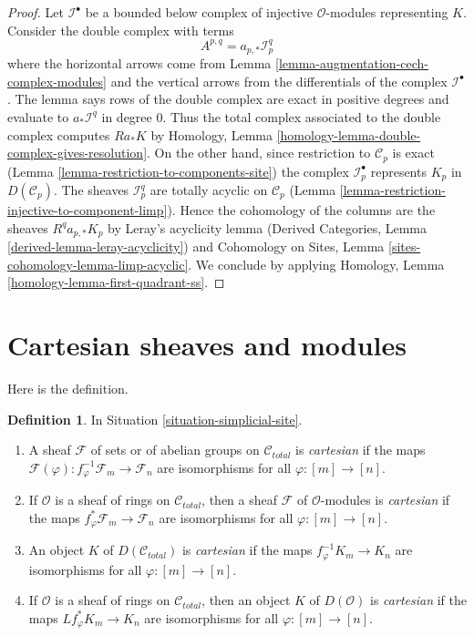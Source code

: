 \documentclass{stacks-project}
\theoremstyle{plain}
\theoremstyle{definition}
\newtheorem{definition}[subsection]{Definition}
\theoremstyle{remark}
\numberwithin{equation}{subsection}
\begin{document}
\begin{proof}
Let $\mathcal{I}^\bullet$ be a bounded below complex of injective
$\mathcal{O}$-modules representing $K$. Consider the double complex with terms
$$
A^{p, q} = a_{p, *}\mathcal{I}^q_p
$$
where the horizontal arrows come from
Lemma \ref{lemma-augmentation-cech-complex-modules}
and the vertical arrows from the differentials of the
complex $\mathcal{I}^\bullet$. The lemma
says rows of the double complex are exact
in positive degrees and evaluate to
$a_*\mathcal{I}^q$ in degree $0$.
Thus the total complex associated to the double complex
computes $Ra_*K$ by
Homology, Lemma \ref{homology-lemma-double-complex-gives-resolution}.
On the other hand, since restriction to $\mathcal{C}_p$ is exact
(Lemma \ref{lemma-restriction-to-components-site})
the complex $\mathcal{I}_p^\bullet$ represents $K_p$ in
$D(\mathcal{C}_p)$. The sheaves $\mathcal{I}_p^q$
are totally acyclic on $\mathcal{C}_p$
(Lemma \ref{lemma-restriction-injective-to-component-limp}).
Hence the cohomology of the columns are the sheaves
$R^qa_{p, *}K_p$ by Leray's acyclicity lemma
(Derived Categories, Lemma \ref{derived-lemma-leray-acyclicity})
and
Cohomology on Sites, Lemma \ref{sites-cohomology-lemma-limp-acyclic}.
We conclude by applying
Homology, Lemma \ref{homology-lemma-first-quadrant-ss}.
\end{proof}





\section{Cartesian sheaves and modules}
\label{section-cartesian}

\noindent
Here is the definition.

\begin{definition}
\label{definition-cartesian-sheaf}
In Situation \ref{situation-simplicial-site}.
\begin{enumerate}
\item A sheaf $\mathcal{F}$ of sets or of abelian groups on
$\mathcal{C}_{total}$ is {\it cartesian} if the maps
$\mathcal{F}(\varphi) : f_\varphi^{-1}\mathcal{F}_m \to \mathcal{F}_n$
are isomorphisms for all $\varphi : [m] \to [n]$.
\item If $\mathcal{O}$ is a sheaf of rings on $\mathcal{C}_{total}$,
then a sheaf $\mathcal{F}$ of $\mathcal{O}$-modules is
{\it cartesian} if  the maps $f_\varphi^*\mathcal{F}_m \to \mathcal{F}_n$
are isomorphisms for all $\varphi : [m] \to [n]$.
\item An object $K$ of $D(\mathcal{C}_{total})$ is {\it cartesian} if the maps
$f_\varphi^{-1}K_m \to K_n$
are isomorphisms for all $\varphi : [m] \to [n]$.
\item If $\mathcal{O}$ is a sheaf of rings on $\mathcal{C}_{total}$, then
an object $K$ of $D(\mathcal{O})$ is {\it cartesian} if the maps
$Lf_\varphi^*K_m \to K_n$
are isomorphisms for all $\varphi : [m] \to [n]$.
\end{enumerate}
\end{definition}
\end{document}
